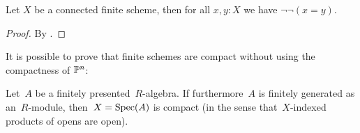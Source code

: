 \begin{theorem}
  Let $X$ be a connected finite scheme, then for all $x,y:X$ we have $\neg\neg (x=y)$.
\end{theorem}

\begin{proof}
  By .
\end{proof}

It is possible to prove that finite schemes are compact without using the compactness of $\mathbb{P}^n$:

\begin{proposition}\label{finite-compact}
Let~$A$ be a finitely presented~$R$-algebra. If furthermore~$A$ is finitely
generated as an~$R$-module, then~$X = \operatorname{Spec}(A)$ is compact (in the sense
that~$X$-indexed products of opens are open).\end{proposition}

